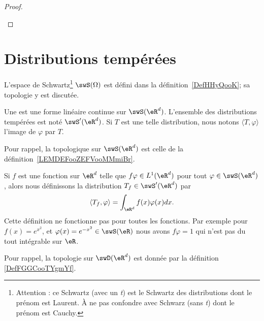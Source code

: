 \begin{proof}
\begin{subproof}
    \end{subproof}
\end{proof}

\section{Distributions tempérées}

L'espace de Schwartz\footnote{Attention : ce Schwartz (avec un \emph{t}) est le Schwartz des distributions dont le prénom est Laurent. À ne pas confondre avec Schwarz (sans \emph{t}) dont le prénom est Cauchy.} \( \swS(\Omega)\) est défini dans la définition~\ref{DefHHyQooK}; sa topologie y est discutée.
\begin{definition}
    Une  est une forme linéaire continue sur \( \swS(\eR^d)\). L'ensemble des distributions tempérées est noté \( \swS'(\eR^d)\). Si \( T\) est une telle distribution, nous notons $\langle T, \varphi\rangle$ l'image de \( \varphi\) par \( T\).
\end{definition}

\begin{normaltext}
    Pour rappel, la topologique sur \( \swS(\eR^d)\) est celle de la définition~\ref{LEMDEFooZEFVooMMmiBr}.
\end{normaltext}

Si \( f\) est une fonction sur \( \eR^d\) telle que \( f\varphi\in L^1(\eR^d)\) pour tout \( \varphi\in \swS(\eR^d)\), alors nous définissons la distribution \( T_f\in\swS'(\eR^d)\) par
\begin{equation}
    \langle T_f, \varphi\rangle =\int_{\eR^d}f(x)\varphi(x)dx.
\end{equation}
Cette définition ne fonctionne pas pour toutes les fonctions. Par exemple pour \( f(x)= e^{x^2}\), et \( \varphi(x)= e^{-x^2}\in\swS(\eR)\) nous avons \( f\varphi=1\) qui n'est pas du tout intégrable sur \( \eR\).

Pour rappel, la topologie sur \( \swD(\eR^d)\) est donnée par la définition \ref{DefFGGCooTYgmYf}.

